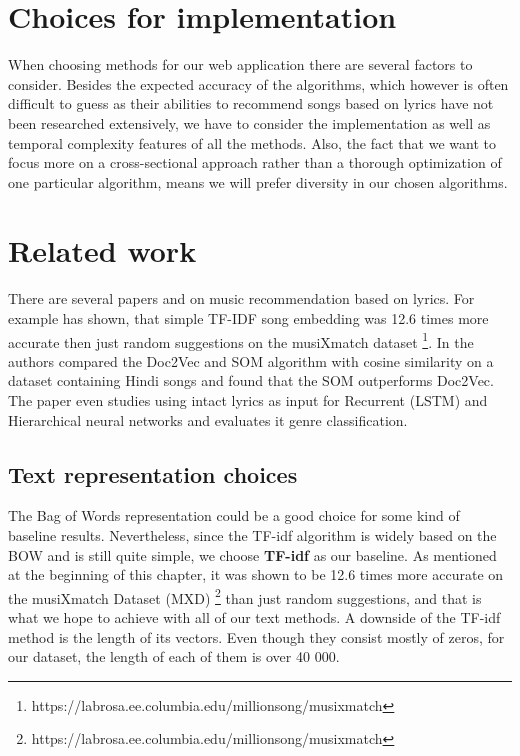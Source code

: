 \section{Choices for implementation}
When choosing methods for our web application there are several factors to consider. Besides the expected accuracy of the algorithms, which however is often difficult to guess as their abilities to recommend songs based on lyrics have not been researched extensively, we have to consider the implementation as well as temporal complexity features of all the methods. Also, the fact that we want to focus more on a cross-sectional approach rather than a thorough optimization of one particular algorithm, means we will prefer diversity in our chosen algorithms. 

\section{Related work}\label{sec:text_related_work}
 There are several papers and on music recommendation based on lyrics. For example \cite{Gossi2016LyricBasedMR} has shown, that simple TF-IDF song embedding was 12.6 times more accurate then just random suggestions on the musiXmatch dataset \footnote{https://labrosa.ee.columbia.edu/millionsong/musixmatch}.  In \cite{inproceedings} the authors compared the Doc2Vec and SOM algorithm with cosine similarity on a dataset containing Hindi songs and found that the SOM outperforms Doc2Vec. The paper \cite{DBLP:journals/corr/Tsaptsinos17} even studies using intact lyrics as input for Recurrent (LSTM) and Hierarchical neural networks and evaluates it genre classification.
 
\subsection{Text representation choices}
The Bag of Words representation could be a good choice for some kind of baseline results. Nevertheless, since the TF-idf algorithm is widely based on the BOW and is still quite simple, we choose \textbf{TF-idf} as our baseline. As mentioned at the beginning of this chapter, it was shown to be 12.6 times more accurate on the musiXmatch Dataset (MXD) \footnote{https://labrosa.ee.columbia.edu/millionsong/musixmatch} than just random suggestions, and that is what we hope to achieve with all of our text methods. A downside of the TF-idf method is the length of its vectors. Even though they consist mostly of zeros, for our dataset, the length of each of them is over 40 000.

